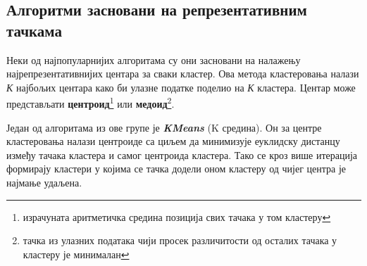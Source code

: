 \documentclass[10pt, a4paper]{article}
\begin{document}
\subsection{Алгоритми засновани на репрезентативним тачкама}
\label{subsec: podnaslov5}
Неки од најпопуларнијих алгоритама су они засновани на налажењу најрепрезентативнијих центара за сваки кластер. Ова метода кластеровања налази {\em К} најбољих центара како би улазне податке поделио на {\em К} кластера. Центар може представљати \textbf{центроид}\footnote{израчуната аритметичка средина позиција свих тачака у том кластеру} или \textbf{медоид}\footnote{тачка из улазних података чији просек различитости од осталих тачака у кластеру је минималан}.

Један од алгоритама из ове групе је \textbf{\em KMeans} (K средина). Он за центре кластеровања налази центроиде са циљем да минимизује еуклидску дистанцу између тачака кластера и самог центроида кластера. Тако се кроз више итерација формирају кластери у којима се тачка додели оном кластеру од чијег центра је најмање удаљена. \cite{kmeans}
\end{document}
